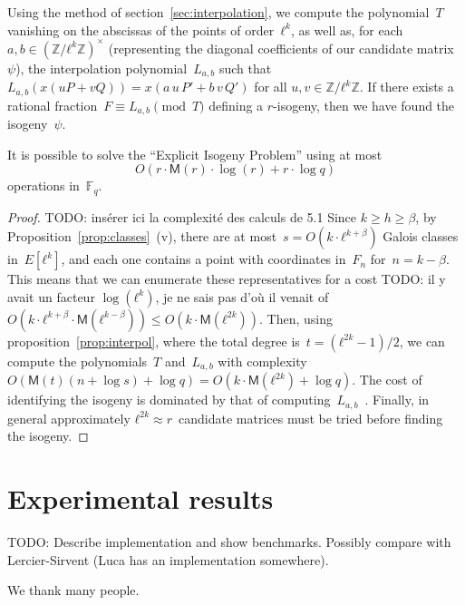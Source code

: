 \documentclass{lms}
\newcommand{\todo}[1]{{\color{red}TODO: #1}}
\def\cout#1{\mathsf{#1}}
\newcommand{\F}{\mathbb{F}}
\newcommand{\MM}{\cout{M}}
\begin{document}
Using the method of section~\ref{sec:interpolation},
we compute the polynomial~$T$ vanishing on the abscissas of
the points of order~$ℓ^k$,
as well as, for each $a, b ∈ (ℤ/ℓ^k ℤ)^×$
(representing the diagonal coefficients of our candidate matrix $ψ$),
the interpolation polynomial~$L_{a,b}$
such that $L_{a,b} (x (u P + v Q)) = x(a\, u\,P' + b\,v\, Q')$
for all $u, v ∈ ℤ/ℓ^k ℤ$.
If there exists a rational fraction~$F ≡ L_{a,b} \pmod{T}$
defining a $r$-isogeny,
then we have found the isogeny~$ψ$.

\begin{thm*}%
It is possible to solve the “Explicit Isogeny Problem”
using at most
\[ O(r · \MM(r) · \log(r) + r · \log q)\]
operations in~$\F_q$.
\end{thm*}%
\begin{proof}%
\todo{insérer ici la complexité des calculs de 5.1}
Since $k ≥ h ≥ β$, by Proposition~\ref{prop:classes}~(v),
there are at most~$s = O(k· ℓ^{k+β})$ Galois classes in~$E[ℓ^k]$,
and each one contains a point with coordinates in~$F_n$ for~$n = k-β$.
This means that we can enumerate these representatives for a cost
\todo{il y avait un facteur $\log(ℓ^k)$, je ne sais pas d'où il venait}
of~$O(k · ℓ^{k+β} · \MM(ℓ^{k-β})) ≤ O(k · \MM(ℓ^{2k}))$.
Then, using proposition~\ref{prop:interpol},
where the total degree is~$t = (ℓ^{2k}-1)/2$,
we can compute the polynomials~$T$ and~$L_{a,b}$ with
complexity~$O(\MM(t) (n + \log s) + \log q)
= O(k · \MM(ℓ^{2k}) + \log q)$.
The cost of identifying the isogeny is dominated by
that of computing~$L_{a,b}$~\cite[§3.3]{df10}.
Finally, in general approximately $ℓ^{2k} ≈ r$~candidate matrices
must be tried before finding the isogeny.
\end{proof}


\section{Experimental results}
\label{sec:implem}

\todo{Describe implementation and show benchmarks. Possibly compare
  with Lercier-Sirvent (Luca has an implementation somewhere).}

\begin{acknowledgements}
  We thank many people.
\end{acknowledgements}
\end{document}
